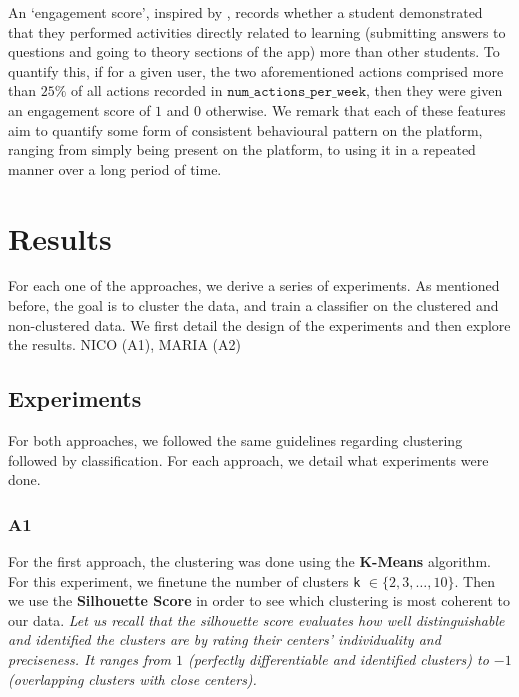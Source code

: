 \documentclass[sigplan,screen]{acmart}
\begin{document}
An `engagement score', inspired by \cite{student_engagement}, records whether a student demonstrated that they performed activities directly related to learning (submitting answers to questions and going to theory sections of the app) more than other students. To quantify this, if for a given user, the two aforementioned actions comprised more than $25\%$ of all actions recorded in $\texttt{num\_actions\_per\_week}$, then they were given an engagement score of $1$ and $0$ otherwise. We remark that each of these features aim to quantify some form of consistent behavioural pattern on the platform, ranging from simply being present on the platform, to using it in a repeated manner over a long period of time. 

\section{Results}\label{sec:results}

For each one of the approaches, we derive a series of experiments. As mentioned before, the goal is to cluster the data, and train a classifier on the clustered and non-clustered data. We first detail the design of the experiments and then explore the results.
{\color{red}NICO (A1), MARIA (A2)}
\subsection{Experiments}\label{subsec:eval}

For both approaches, we followed the same guidelines regarding clustering followed by classification. For each approach, we detail what experiments were done.

\subsubsection{A1}
For the first approach, the clustering was done using the \textbf{K-Means} algorithm. For this experiment, we finetune the number of clusters \texttt{k} $\in \{2,3,\ldots, 10\}$. Then we use the \textbf{Silhouette Score} in order to see which clustering is most coherent to our data. \textit{Let us recall that the silhouette score evaluates how well distinguishable and identified the clusters are by rating their centers’ individuality and preciseness. It ranges from $1$ (perfectly differentiable and identified clusters) to $-1$ (overlapping clusters with close centers).}
\end{document}
